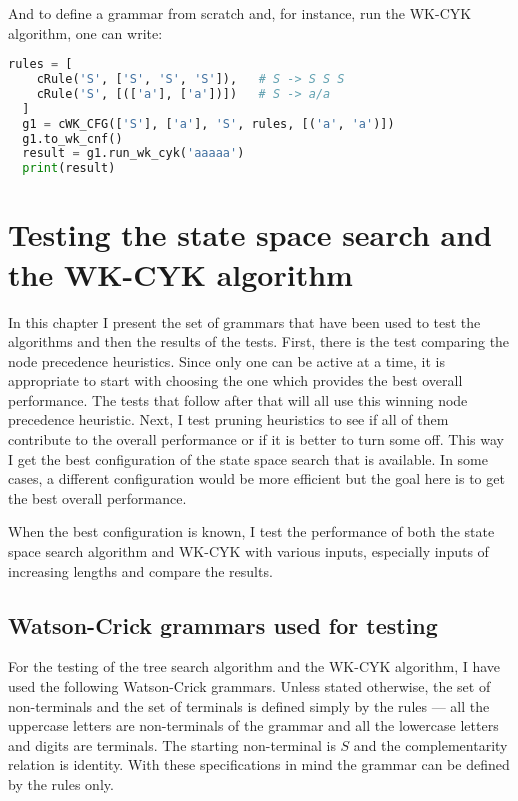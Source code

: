 And to define a grammar from scratch and, for instance, run the WK-CYK algorithm, one can write:
\begin{lstlisting}[language=Python]
  rules = [
    cRule('S', ['S', 'S', 'S']),   # S -> S S S
    cRule('S', [(['a'], ['a'])])   # S -> a/a
  ]
  g1 = cWK_CFG(['S'], ['a'], 'S', rules, [('a', 'a')])
  g1.to_wk_cnf()
  result = g1.run_wk_cyk('aaaaa')
  print(result)
\end{lstlisting}


\chapter{Testing the state space search and the WK-CYK algorithm} \label{chapter:testing}

In this chapter I present the set of grammars that have been used to test the algorithms and then the results of the tests. First, there is the test comparing the node precedence heuristics. Since only one can be active at a time, it is appropriate to start with choosing the one which provides the best overall performance. The tests that follow after that will all use this winning node precedence heuristic. Next, I test pruning heuristics to see if all of them contribute to the overall performance or if it is better to turn some off. This way I get the best configuration of the state space search that is available. In some cases, a different configuration would be more efficient but the goal here is to get the best overall performance.

When the best configuration is known, I test the performance of both the state space search algorithm and WK-CYK with various inputs, especially inputs of increasing lengths and compare the results.

\section{Watson-Crick grammars used for testing}

For the testing of the tree search algorithm and the WK-CYK algorithm, I have used the following Watson-Crick grammars. Unless stated otherwise, the set of non-terminals and the set of terminals is defined simply by the rules --- all the uppercase letters are non-terminals of the grammar and all the lowercase letters and digits are terminals. The starting non-terminal is $S$ and the complementarity relation is identity. With these specifications in mind the grammar can be defined by the rules only.

